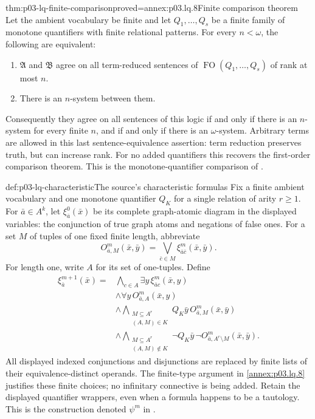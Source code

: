 \begin{hbtheorem}{thm:p03-lq-finite-comparison}{proved=annex:p03.lq.8}{Finite comparison theorem}
Let the ambient vocabulary be finite and let \(Q_1,\ldots,Q_s\)
be a finite family of monotone quantifiers with finite relational
patterns. For every \(n<\omega\), the following are equivalent:
\begin{enumerate}
 \item \(\mathfrak A\) and \(\mathfrak B\) agree on all term-reduced
       sentences of \(\operatorname{FO}(Q_1,\ldots,Q_s)\) of rank
       at most \(n\).
 \item There is an \(n\)-system between them.
\end{enumerate}
Consequently they agree on all sentences of this logic if and only if
there is an \(n\)-system for every finite \(n\), and if and only if
there is an \(\omega\)-system. Arbitrary terms are allowed in this
last sentence-equivalence assertion: term reduction preserves truth,
but can increase rank.
For no added quantifiers this recovers the first-order comparison
theorem. This is the monotone-quantifier comparison of
\cite[Ch.~II, Theorem~4.2.3 and Corollary~4.2.4,
pp.~54--56]{Ebbinghaus1985ExtendedLogics}.
\end{hbtheorem}

\begin{hbdefinition}{def:p03-lq-characteristic}{The source's characteristic formulas}
Fix a finite ambient vocabulary and one monotone quantifier \(Q_K\)
for a single relation of arity \(r\geq1\). For \(\bar a\in A^k\),
let \(\xi^0_{\bar a}(\bar x)\) be its complete graph-atomic diagram
in the displayed variables: the conjunction of true graph atoms and
negations of false ones. For a set \(M\) of tuples of one fixed
finite length, abbreviate
\[
 O^m_{\bar a,M}(\bar x,\bar y)
       =\bigvee_{\bar c\in M}\xi^m_{\bar a\bar c}(\bar x,\bar y).
\]
For length one, write \(A\) for its set of one-tuples. Define
\[
\begin{aligned}
 \xi^{m+1}_{\bar a}(\bar x)={}&
 \bigwedge_{c\in A}\exists y\,\xi^m_{\bar a c}(\bar x,y)
       \\
 &\land\forall y\,O^m_{\bar a,A}(\bar x,y)\\
 &\land\!\bigwedge_{\substack{M\subseteq A^r\\ (A,M)\in K}}
             Q_K\bar y\,O^m_{\bar a,M}(\bar x,\bar y)\\
 &\land\!\bigwedge_{\substack{M\subseteq A^r\\ (A,M)\notin K}}
             \neg Q_K\bar y\,\neg
                     O^m_{\bar a,A^r\setminus M}(\bar x,\bar y).
\end{aligned}
\]
All displayed indexed conjunctions and disjunctions are replaced by
finite lists of their equivalence-distinct operands. The finite-type
argument in \cref{annex:p03.lq.8} justifies these finite choices;
no infinitary connective is being added. Retain the displayed
quantifier wrappers, even when a formula happens to be a tautology.
This is the construction denoted \(\psi^m\) in
\cite[Ch.~II, Definition~4.2.5, p.~55]{Ebbinghaus1985ExtendedLogics}.
\end{hbdefinition}

